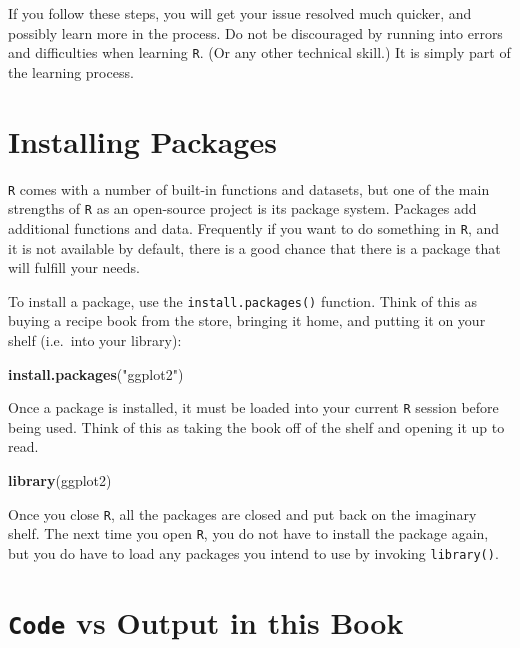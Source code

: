 \documentclass[]{book}
\newenvironment{Shaded}{\begin{snugshade}}{\end{snugshade}}
\newcommand{\KeywordTok}[1]{\textcolor[rgb]{0.13,0.29,0.53}{\textbf{#1}}}
\newcommand{\StringTok}[1]{\textcolor[rgb]{0.31,0.60,0.02}{#1}}
\newcommand{\NormalTok}[1]{#1}
\begin{document}
If you follow these steps, you will get your issue resolved much
quicker, and possibly learn more in the process. Do not be discouraged
by running into errors and difficulties when learning \texttt{R}. (Or
any other technical skill.) It is simply part of the learning process.

\section{Installing Packages}\label{installing-packages}

\texttt{R} comes with a number of built-in functions and datasets, but
one of the main strengths of \texttt{R} as an open-source project is its
package system. Packages add additional functions and data. Frequently
if you want to do something in \texttt{R}, and it is not available by
default, there is a good chance that there is a package that will
fulfill your needs.

To install a package, use the \texttt{install.packages()} function.
Think of this as buying a recipe book from the store, bringing it home,
and putting it on your shelf (i.e.~into your library):

\begin{Shaded}
\begin{Highlighting}[]
\KeywordTok{install.packages}\NormalTok{(}\StringTok{"ggplot2"}\NormalTok{)}
\end{Highlighting}
\end{Shaded}

Once a package is installed, it must be loaded into your current
\texttt{R} session before being used. Think of this as taking the book
off of the shelf and opening it up to read.

\begin{Shaded}
\begin{Highlighting}[]
\KeywordTok{library}\NormalTok{(ggplot2)}
\end{Highlighting}
\end{Shaded}

Once you close \texttt{R}, all the packages are closed and put back on
the imaginary shelf. The next time you open \texttt{R}, you do not have
to install the package again, but you do have to load any packages you
intend to use by invoking \texttt{library()}.

\section{\texorpdfstring{\texttt{Code} vs Output in this
Book}{Code vs Output in this Book}}\label{code-output}
\end{document}
